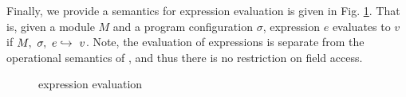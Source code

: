 Finally, we provide a semantics for expression evaluation is given in Fig. \ref{f:evaluation}. 
That is, given a module $M$ and a program configuration $\sigma$, expression $e$ evaluates to $v$
if $M,\ \sigma,\ e \hookrightarrow\ v$. Note, the evaluation of expressions is separate from the operational
semantics of \Loo, and thus there is no restriction on field access.
\begin{figure}
\caption{\Loo expression evaluation}
\label{f:evaluation}
\end{figure}

